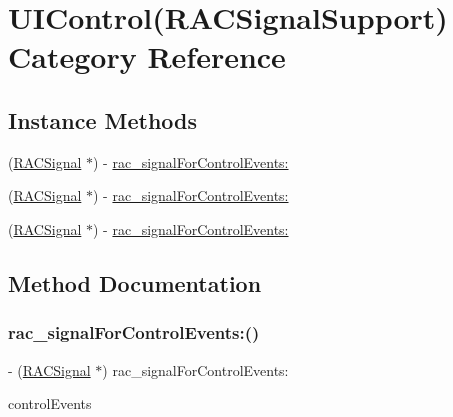 \hypertarget{category_u_i_control_07_r_a_c_signal_support_08}{}\section{U\+I\+Control(R\+A\+C\+Signal\+Support) Category Reference}
\label{category_u_i_control_07_r_a_c_signal_support_08}
\subsection*{Instance Methods}
\begin{DoxyCompactItemize}
\item 
(\mbox{\hyperlink{interface_r_a_c_signal}{R\+A\+C\+Signal}} $\ast$) -\/ \mbox{\hyperlink{category_u_i_control_07_r_a_c_signal_support_08_ab17517bd2e2c783a3f9c292a62c40e01}{rac\+\_\+signal\+For\+Control\+Events\+:}}
\item 
(\mbox{\hyperlink{interface_r_a_c_signal}{R\+A\+C\+Signal}} $\ast$) -\/ \mbox{\hyperlink{category_u_i_control_07_r_a_c_signal_support_08_ab17517bd2e2c783a3f9c292a62c40e01}{rac\+\_\+signal\+For\+Control\+Events\+:}}
\item 
(\mbox{\hyperlink{interface_r_a_c_signal}{R\+A\+C\+Signal}} $\ast$) -\/ \mbox{\hyperlink{category_u_i_control_07_r_a_c_signal_support_08_ab17517bd2e2c783a3f9c292a62c40e01}{rac\+\_\+signal\+For\+Control\+Events\+:}}
\end{DoxyCompactItemize}


\subsection{Method Documentation}
\mbox{\label{category_u_i_control_07_r_a_c_signal_support_08_ab17517bd2e2c783a3f9c292a62c40e01}} 
\subsubsection{\texorpdfstring{rac\+\_\+signal\+For\+Control\+Events\+:()}{rac\_signalForControlEvents:()}\hspace{0.1cm}{\footnotesize\ttfamily [1/3]}}
{\footnotesize\ttfamily -\/ (\mbox{\hyperlink{interface_r_a_c_signal}{R\+A\+C\+Signal}} $\ast$) rac\+\_\+signal\+For\+Control\+Events\+: \begin{DoxyParamCaption}\item[{(U\+I\+Control\+Events)}]{control\+Events }\end{DoxyParamCaption}}


